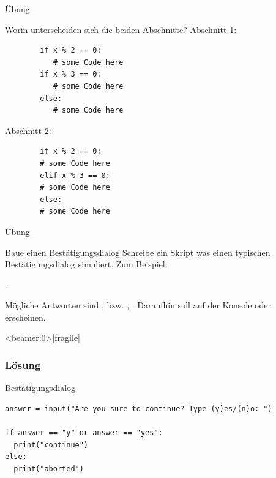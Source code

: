 \begin{fragile}{Übung}
	\begin{block}{Worin unterscheiden sich die beiden Abschnitte?}
		\vspace{5pt}
		Abschnitt 1: 
		\begin{verbatim}
		if x % 2 == 0: 
		   # some Code here
		if x % 3 == 0: 
		   # some Code here
		else: 
		   # some Code here  
		\end{verbatim}
		Abschnitt 2: 
		\begin{verbatim}
		if x % 2 == 0: 
		# some Code here
		elif x % 3 == 0: 
		# some Code here
		else: 
		# some Code here  
		\end{verbatim}
	\end{block}
\end{fragile}

\begin{frame}{Übung}
\begin{block}{Baue einen Bestätigungsdialog}
\vspace{2pt}
Schreibe ein Skript was einen typischen Bestätigungsdialog simuliert. 
Zum Beispiel: 

. 

Mögliche Antworten sind ,  bzw. , . 
Daraufhin soll auf der Konsole  oder  erscheinen. 
\end{block}
\end{frame}


\begin{frame}<beamer:0>[fragile]
\frametitle{Lösung}
\begin{solutionblock}{Bestätigungsdialog}
\begin{verbatim}
answer = input("Are you sure to continue? Type (y)es/(n)o: ")

if answer == "y" or answer == "yes":
  print("continue")
else:
  print("aborted")
\end{verbatim}
\end{solutionblock}
\end{frame}

